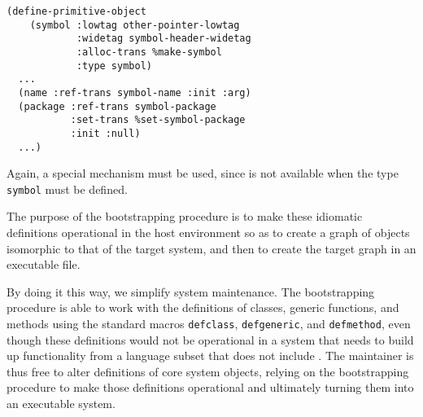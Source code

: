 \begin{verbatim}
(define-primitive-object
    (symbol :lowtag other-pointer-lowtag
            :widetag symbol-header-widetag
            :alloc-trans %make-symbol
            :type symbol)
  ...
  (name :ref-trans symbol-name :init :arg)
  (package :ref-trans symbol-package
           :set-trans %set-symbol-package
           :init :null)
  ...)
\end{verbatim}

\noindent
Again, a special mechanism must be used, since \clos{} is not
available when the type \texttt{symbol} must be defined.

The purpose of the \sicl{} bootstrapping procedure is to make these
idiomatic definitions operational in the host environment so as to
create a graph of objects isomorphic to that of the target system, and
then to create the target graph in an executable file.

By doing it this way, we simplify system maintenance.  The
bootstrapping procedure is able to work with the definitions of
classes, generic functions, and methods using the standard macros
\texttt{defclass}, \texttt{defgeneric}, and \texttt{defmethod}, even
though these definitions would not be operational in a system that
needs to build up functionality from a language subset that does not
include \clos{}.  The \sicl{} maintainer is thus free to alter
definitions of core system objects, relying on the bootstrapping
procedure to make those definitions operational and ultimately turning
them into an executable system.
